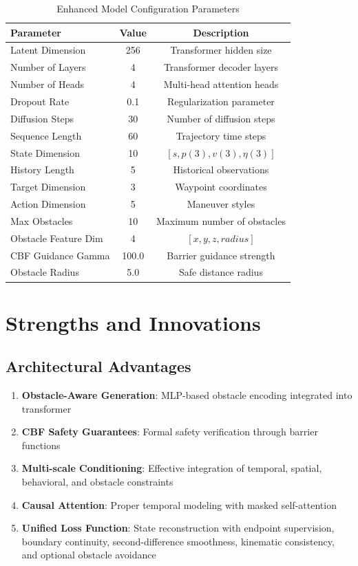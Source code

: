 \documentclass[12pt]{article}
\begin{document}
\begin{table}[h]
\centering
\caption{Enhanced Model Configuration Parameters}
\begin{tabular}{lcc}
\toprule
\textbf{Parameter} & \textbf{Value} & \textbf{Description} \\
\midrule
Latent Dimension & 256 & Transformer hidden size \\
Number of Layers & 4 & Transformer decoder layers \\
Number of Heads & 4 & Multi-head attention heads \\
Dropout Rate & 0.1 & Regularization parameter \\
Diffusion Steps & 30 & Number of diffusion steps \\
Sequence Length & 60 & Trajectory time steps \\
State Dimension & 10 & $[s, p(3), v(3), \eta(3)]$ \\
History Length & 5 & Historical observations \\
Target Dimension & 3 & Waypoint coordinates \\
Action Dimension & 5 & Maneuver styles \\
Max Obstacles & 10 & Maximum number of obstacles \\
Obstacle Feature Dim & 4 & $[x, y, z, radius]$ \\
CBF Guidance Gamma & 100.0 & Barrier guidance strength \\
Obstacle Radius & 5.0 & Safe distance radius \\
\bottomrule
\end{tabular}
\end{table}

\section{Strengths and Innovations}

\subsection{Architectural Advantages}

\begin{enumerate}
    \item \textbf{Obstacle-Aware Generation}: MLP-based obstacle encoding integrated into transformer
    \item \textbf{CBF Safety Guarantees}: Formal safety verification through barrier functions
    \item \textbf{Multi-scale Conditioning}: Effective integration of temporal, spatial, behavioral, and obstacle constraints
    \item \textbf{Causal Attention}: Proper temporal modeling with masked self-attention
    \item \textbf{Unified Loss Function}: State reconstruction with endpoint supervision, boundary continuity, second-difference smoothness, kinematic consistency, and optional obstacle avoidance
\end{enumerate}
\end{document}
